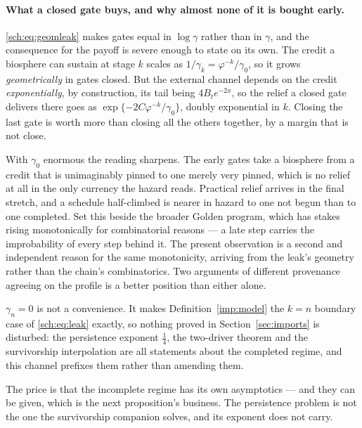 \paragraph{What a closed gate buys, and why almost none of it is
bought early.}\label{sch:rem:backloaded}
\eqref{sch:eq:geomleak} makes gates equal in $\log\gamma$ rather than in
$\gamma$, and the consequence for the payoff is severe enough to state
on its own. The credit a biosphere can sustain at stage $k$ scales as
$1/\gamma_k=\varphi^{-k}/\gamma_0$, so it grows \emph{geometrically} in
gates closed. But the external channel depends on the credit \emph{exponentially}, by construction, its tail being $4B_te^{-2x}$, so the
relief a closed gate delivers there goes as
$\exp\{-2C\varphi^{-k}/\gamma_0\}$, doubly exponential in $k$.
Closing the last gate is worth more than closing all the others
together, by a margin that is not close.

With $\gamma_0$ enormous the reading sharpens. The early gates take a
biosphere from a credit that is unimaginably pinned to one merely very
pinned, which is no relief at all in the only currency the hazard reads.
Practical relief arrives in the final stretch, and a schedule
half-climbed is nearer in hazard to one not begun than to one completed. Set this beside the broader Golden program, which has stakes rising
monotonically for combinatorial reasons --- a late step carries the
improbability of every step behind it. The present observation is a
second and independent reason for the same monotonicity, arriving from
the leak's geometry rather than the chain's combinatorics. Two arguments
of different provenance agreeing on the profile is a better position
than either alone.

\begin{remark}
\label{sch:rem:limit}
$\gamma_n=0$ is not a convenience. It makes
Definition~\ref{imp:model} the $k=n$ boundary case of
\eqref{sch:eq:leak} exactly, so nothing proved in
Section~\ref{sec:imports} is disturbed: the
persistence exponent $\tfrac14$, the two-driver
theorem and the survivorship interpolation are all statements about the
completed regime, and this channel prefixes them rather than amending
them.

The price is that the incomplete regime has its own asymptotics --- and
they can be given, which is the next proposition's business. The
persistence problem is not the one the survivorship companion \cite{GoldenSurvivorship} solves, and
its exponent does not carry.
\end{remark}

